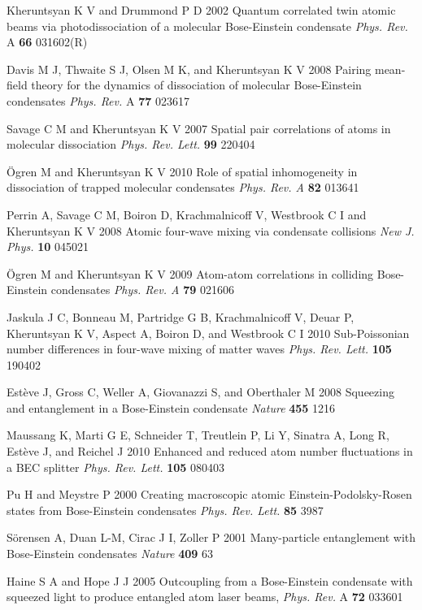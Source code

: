\documentclass{iopart}
\begin{document}
\begin{thebibliography}{10}
 Kheruntsyan K V and Drummond P D 2002 Quantum correlated twin atomic beams via photodissociation of a molecular Bose-Einstein condensate \emph {Phys. Rev.} A {\bf 66} 031602(R)

 Davis M J, Thwaite S J, Olsen M K, and Kheruntsyan K V 2008 Pairing mean-field theory for the dynamics of dissociation of molecular Bose-Einstein condensates \emph{Phys. Rev.} A {\bf 77} 023617

 Savage C M and Kheruntsyan K V 2007 Spatial pair correlations of atoms in molecular dissociation \emph{Phys. Rev. Lett.} {\bf 99} 220404 

 {\"{O}}gren M and Kheruntsyan K V 2010 Role of spatial inhomogeneity in dissociation of trapped molecular condensates \emph{Phys. Rev. A} {\bf 82} 013641

 Perrin A, Savage C M, Boiron D, Krachmalnicoff V, Westbrook C I and Kheruntsyan K V 2008 Atomic four-wave mixing via condensate collisions \emph{New J. Phys.} {\bf 10} 045021

 {\"{O}}gren M and Kheruntsyan K V 2009 Atom-atom correlations in colliding Bose-Einstein condensates \emph{Phys. Rev. A} {\bf 79} 021606

 Jaskula J C, Bonneau M, Partridge G B, Krachmalnicoff V, Deuar P, Kheruntsyan K V, Aspect A, Boiron D, and Westbrook C I 2010 Sub-Poissonian number differences in four-wave mixing of matter waves \emph{Phys. Rev. Lett.} {\bf 105} 190402

 Est{\`{e}}ve J, Gross C, Weller A, Giovanazzi S, and Oberthaler M 2008 Squeezing and entanglement in a Bose-Einstein condensate \emph{Nature} {\bf 455} 1216

 Maussang K, Marti G E, Schneider T, Treutlein P, Li Y, Sinatra A, Long R, Est{\`{e}}ve J, and Reichel J 2010 Enhanced and reduced atom number fluctuations in a BEC splitter \emph{Phys. Rev. Lett.} {\bf 105} 080403

 Pu H and Meystre P 2000 Creating macroscopic atomic Einstein-Podolsky-Rosen states from Bose-Einstein condensates \emph{Phys. Rev. Lett.} {\bf 85} 3987

 S{\"{o}}rensen A, Duan L-M, Cirac J I, Zoller P 2001 Many-particle entanglement with Bose-Einstein condensates \emph{Nature} {\bf 409} 63

 Haine S A and Hope J J 2005 Outcoupling from a Bose-Einstein condensate with squeezed light to produce entangled atom laser beams, \emph{Phys. Rev.} A {\bf 72} 033601


\end{thebibliography}
\end{document}
